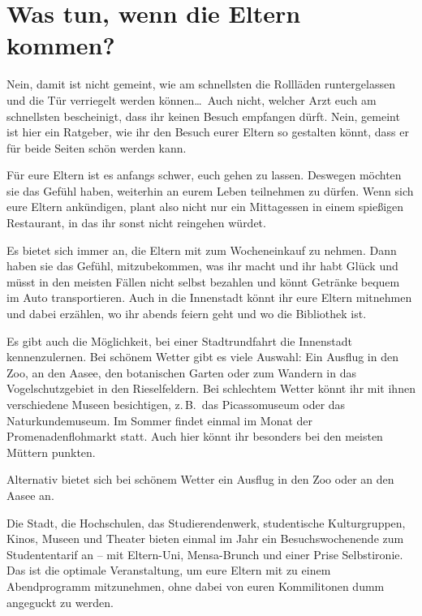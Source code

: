 \section{Was tun, wenn die Eltern kommen?}
\begin{multicols}{2}
Nein, damit ist nicht gemeint, wie am schnellsten die Rollläden runtergelassen und die Tür verriegelt werden können\dots\
Auch nicht, welcher Arzt euch am schnellsten bescheinigt, dass ihr keinen Besuch empfangen dürft.
Nein, gemeint ist hier ein Ratgeber, wie ihr den Besuch eurer Eltern so gestalten könnt, dass er für beide Seiten schön werden kann.

\begin{center}
\end{center}

Für eure Eltern ist es anfangs schwer, euch gehen zu lassen.
Deswegen möchten sie das Gefühl haben, weiterhin an eurem Leben teilnehmen zu dürfen.
Wenn sich eure Eltern ankündigen, plant also nicht nur ein Mittagessen in einem spießigen Restaurant, in das ihr sonst nicht reingehen würdet.

Es bietet sich immer an, die Eltern mit zum Wocheneinkauf zu nehmen.
Dann haben sie das Gefühl, mitzubekommen, was ihr macht und ihr habt Glück und müsst in den meisten Fällen nicht selbst bezahlen und könnt Getränke bequem im Auto transportieren.
Auch in die Innenstadt könnt ihr eure Eltern mitnehmen und dabei erzählen, wo ihr abends feiern geht und wo die Bibliothek ist.

Es gibt auch die Möglichkeit, bei einer Stadtrundfahrt die Innenstadt kennenzulernen.
Bei schönem Wetter gibt es viele Auswahl: Ein Ausflug in den Zoo, an den Aasee, den botanischen Garten oder zum Wandern in das Vogelschutzgebiet in den Rieselfeldern.
Bei schlechtem Wetter könnt ihr mit ihnen verschiedene Museen besichtigen, z.\,B.\ das Picassomuseum oder das Naturkundemuseum.
Im Sommer findet einmal im Monat der Promenadenflohmarkt statt.
Auch hier könnt ihr besonders bei den meisten Müttern punkten.

Alternativ bietet sich bei schönem Wetter ein Ausflug in den Zoo oder an den Aasee an.

Die Stadt, die Hochschulen, das Studierendenwerk, studentische Kulturgruppen, Kinos, Museen und Theater bieten einmal im Jahr ein Besuchswochenende zum Studententarif an – mit Eltern-Uni, Mensa-Brunch und einer Prise Selbstironie.
Das ist die optimale Veranstaltung, um eure Eltern mit zu einem Abendprogramm mitzunehmen, ohne dabei von euren Kommilitonen dumm angeguckt zu werden.


\end{multicols}
